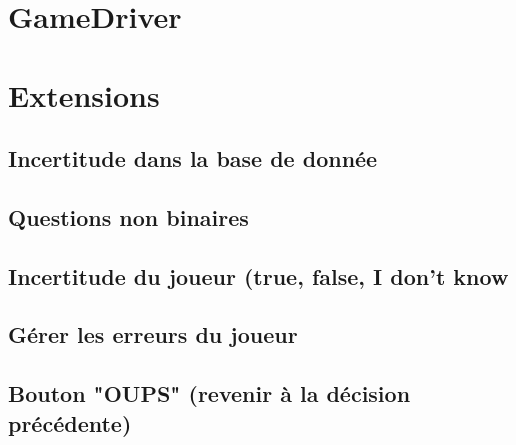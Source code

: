 \documentclass[12pt]{article}
\begin{document}
\section{GameDriver}

\section{Extensions}

\subsection{Incertitude dans la base de donnée}

\subsection{Questions non binaires}

\subsection{Incertitude du joueur (true, false, I don't know}

\subsection{Gérer les erreurs du joueur}

\subsection{Bouton "OUPS" (revenir à la décision précédente)}
\end{document}
